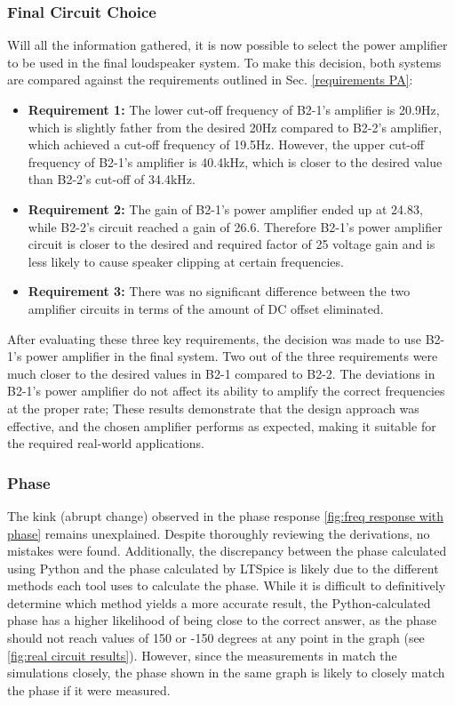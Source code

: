 \subsubsection{Final Circuit Choice}
Will all the information gathered, it is now possible to select the power amplifier to be used in the final loudspeaker system. To make this decision, both systems are compared against the requirements outlined in Sec. \ref{requirements PA}:

 
\label{section: choosing a circuit}
\begin{itemize}[H]
    \item \textbf{Requirement 1:} The lower cut-off frequency of B2-1's amplifier is 20.9Hz, which is slightly father from the desired 20Hz compared to B2-2's amplifier, which achieved a cut-off frequency of 19.5Hz. However, the upper cut-off frequency of B2-1's amplifier is 40.4kHz, which is closer to the desired value than B2-2's cut-off of 34.4kHz.
    \item \textbf{Requirement 2:} The gain of B2-1's power amplifier ended up at 24.83, while B2-2's circuit reached a gain of 26.6. Therefore B2-1's power amplifier circuit is closer to the desired and required factor of 25 voltage gain and is less likely to cause speaker clipping at certain frequencies.
    \item\textbf{Requirement 3:} There was no significant difference between the two amplifier circuits in terms of the amount of DC offset eliminated.
\end{itemize}
After evaluating these three key requirements, the decision was made to use B2-1's power amplifier in the final system. Two out of the three requirements were much closer to the desired values in B2-1 compared to B2-2. The deviations in B2-1's power amplifier do not affect its ability to amplify the correct frequencies at the proper rate; These results demonstrate that the design approach was effective, and the chosen amplifier performs as expected, making it suitable for the required real-world applications.

\subsubsection{Phase}
The kink (abrupt change) observed in the phase response \autoref{fig:freq response with phase} remains unexplained. Despite thoroughly reviewing the derivations, no mistakes were found. Additionally, the discrepancy between the phase calculated using Python and the phase calculated by LTSpice is likely due to the different methods each tool uses to calculate the phase. While it is difficult to definitively determine which method yields a more accurate result, the Python-calculated phase has a higher likelihood of being close to the correct answer, as the phase should not reach values of 150 or -150 degrees at any point in the graph (see \autoref{fig:real circuit results}). However, since the measurements in  match the simulations closely, the phase shown in the same graph is likely to closely match the phase if it were measured.






